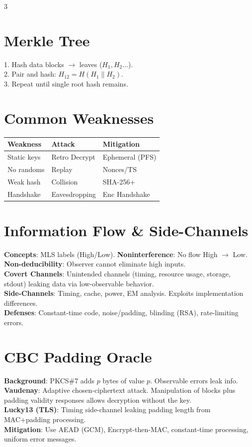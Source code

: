 \documentclass[10pt,landscape]{article}
\begin{document}
\begin{multicols*}{3}
\section*{Merkle Tree}
1. Hash data blocks $\to$ leaves ($H_1, H_2 \dots$). \\
2. Pair and hash: $H_{12} = H(H_1 \| H_2)$. \\
3. Repeat until single root hash remains.

\section*{Common Weaknesses}
\begin{tabular}{@{}lll@{}}
\toprule
Weakness & Attack & Mitigation \\ \midrule
Static keys & Retro Decrypt & Ephemeral (PFS) \\
No randoms & Replay & Nonces/TS \\
Weak hash & Collision & SHA-256+ \\
Handshake & Eavesdropping & Enc Handshake \\ \bottomrule
\end{tabular}

\section*{Information Flow \& Side-Channels}
\textbf{Concepts}: MLS labels (High/Low). \textbf{Noninterference}: No flow High $\to$ Low. \textbf{Non-deducibility}: Observer cannot eliminate high inputs. \\
\textbf{Covert Channels}: Unintended channels (timing, resource usage, storage, stdout) leaking data via low-observable behavior. \\
\textbf{Side-Channels}: Timing, cache, power, EM analysis. Exploits implementation differences. \\
\textbf{Defenses}: Constant-time code, noise/padding, blinding (RSA), rate-limiting errors.

\section*{CBC Padding Oracle}
\textbf{Background}: PKCS\#7 adds $p$ bytes of value $p$. Observable errors leak info. \\
\textbf{Vaudenay}: Adaptive chosen-ciphertext attack. Manipulation of blocks plus padding validity responses allows decryption without the key. \\
\textbf{Lucky13 (TLS)}: Timing side-channel leaking padding length from MAC+padding processing. \\
\textbf{Mitigation}: Use AEAD (GCM), Encrypt-then-MAC, constant-time processing, uniform error messages.


\end{multicols*}
\end{document}
